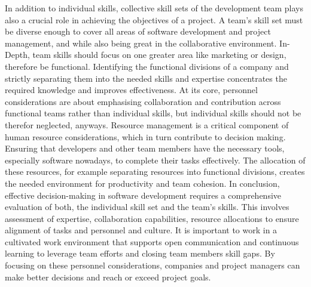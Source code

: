 \noindent In addition to individual skills, collective skill sets of the development team plays also a crucial role in achieving the objectives of a project. A team's skill set must be diverse enough to cover all areas of software development and project management, and while also being great in the collaborative environment. In-Depth, team skills should focus on one greater area like marketing or design, therefore be functional. Identifying the functional divisions of a company and strictly separating them into the needed skills and expertise concentrates the required knowledge and improves effectiveness. At its core, personnel considerations are about emphasising collaboration and contribution across functional teams rather than individual skills, but individual skills should not be therefor neglected, anyways. 
\newline \noindent Resource management is a critical component of human resource considerations, which in turn contribute to decision making. Ensuring that developers and other team members have the necessary tools, especially software nowadays, to complete their tasks effectively. The allocation of these resources, for example separating resources into functional divisions, creates the needed environment for productivity and team cohesion. 
\newline \noindent In conclusion, effective decision-making in software development requires a comprehensive evaluation of both, the individual skill set and the team's skills. This involves assessment of expertise, collaboration capabilities, resource allocations to ensure alignment of tasks and personnel and culture. It is important to work in a cultivated work environment that supports open communication and continuous learning to leverage team efforts and closing team members skill gaps. By focusing on these personnel considerations, companies and project managers can make better decisions and reach or exceed project goals. \cite{podolny_how_2020}

\newpage
